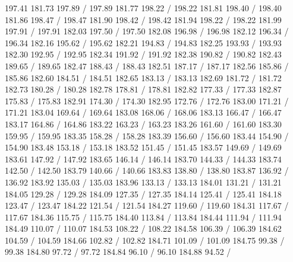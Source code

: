 { 197.41 181.73 197.89 /
 197.89 181.77 198.22 /
 198.22 181.81 198.40 /
 198.40 181.86 198.47 /
 198.47 181.90 198.42 /
 198.42 181.94 198.22 /
 198.22 181.99 197.91 /
 197.91 182.03 197.50 /
 197.50 182.08 196.98 /
 196.98 182.12 196.34 /
 196.34 182.16 195.62 /
 195.62 182.21 194.83 /
 194.83 182.25 193.93 /
 193.93 182.30 192.95 /
 192.95 182.34 191.92 /
 191.92 182.38 190.82 /
 190.82 182.43 189.65 /
 189.65 182.47 188.43 /
 188.43 182.51 187.17 /
 187.17 182.56 185.86 /
 185.86 182.60 184.51 /
 184.51 182.65 183.13 /
 183.13 182.69 181.72 /
 181.72 182.73 180.28 /
 180.28 182.78 178.81 /
 178.81 182.82 177.33 /
 177.33 182.87 175.83 /
 175.83 182.91 174.30 /
 174.30 182.95 172.76 /
 172.76 183.00 171.21 /
 171.21 183.04 169.64 /
 169.64 183.08 168.06 /
 168.06 183.13 166.47 /
 166.47 183.17 164.86 /
 164.86 183.22 163.23 /
 163.23 183.26 161.60 /
 161.60 183.30 159.95 /
 159.95 183.35 158.28 /
 158.28 183.39 156.60 /
 156.60 183.44 154.90 /
 154.90 183.48 153.18 /
 153.18 183.52 151.45 /
 151.45 183.57 149.69 /
 149.69 183.61 147.92 /
 147.92 183.65 146.14 /
 146.14 183.70 144.33 /
 144.33 183.74 142.50 /
 142.50 183.79 140.66 /
 140.66 183.83 138.80 /
 138.80 183.87 136.92 /
 136.92 183.92 135.03 /
 135.03 183.96 133.13 /
 133.13 184.01 131.21 /
 131.21 184.05 129.28 /
 129.28 184.09 127.35 /
 127.35 184.14 125.41 /
 125.41 184.18 123.47 /
 123.47 184.22 121.54 /
 121.54 184.27 119.60 /
 119.60 184.31 117.67 /
 117.67 184.36 115.75 /
 115.75 184.40 113.84 /
 113.84 184.44 111.94 /
 111.94 184.49 110.07 /
 110.07 184.53 108.22 /
 108.22 184.58 106.39 /
 106.39 184.62 104.59 /
 104.59 184.66 102.82 /
 102.82 184.71 101.09 /
 101.09 184.75 99.38 /
 99.38 184.80 97.72 /
 97.72 184.84 96.10 /
 96.10 184.88 94.52 /
}
